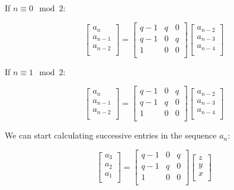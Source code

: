 \documentclass[paper.tex]{subfiles}
\begin{document}
If $n \equiv 0 \mod 2$:

\[ 
\left[ \begin{array}{ccc}
a_{n} \\
a_{n-1} \\
a_{n-2} \\
\end{array} \right] 
=
\left[ \begin{array}{ccc}
q-1 & q & 0 \\
q-1 & 0 & q \\
1 & 0 & 0 \\
\end{array} \right]
\left[ \begin{array}{ccc}
a_{n-2} \\
a_{n-3} \\
a_{n-4} \\
\end{array} \right] 
\] 

If $n \equiv 1 \mod 2$:

\[ 
\left[ \begin{array}{ccc}
a_{n} \\
a_{n-1} \\
a_{n-2} \\
\end{array} \right] 
=
\left[ \begin{array}{ccc}
q-1 & 0 & q \\
q-1 & q & 0 \\
1 & 0 & 0 \\
\end{array} \right]
\left[ \begin{array}{ccc}
a_{n-2} \\
a_{n-3} \\
a_{n-4} \\
\end{array} \right] 
\] 


We can start calculating successive entries in the sequence {$a_{n}$}:

\[ 
\left[ \begin{array}{ccc}
a_{3} \\
a_{2} \\
a_{1} \\
\end{array} \right] 
=
\left[ \begin{array}{ccc}
q-1 & 0 & q \\
q-1 & q & 0 \\
1 & 0 & 0 \\
\end{array} \right]
\left[ \begin{array}{ccc}
z \\
y \\
x \\
\end{array} \right] 
\] 
\end{document}
